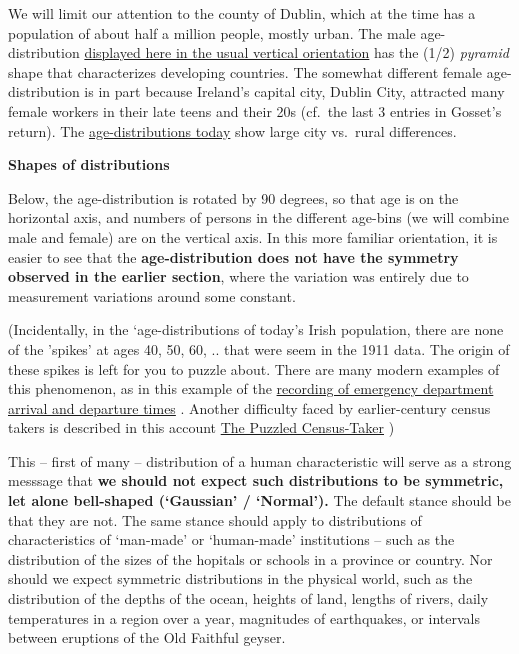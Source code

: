 \documentclass[
]{article}
\begin{document}
We will limit our attention to the county of Dublin, which at the time
has a population of about half a million people, mostly urban. The male
age-distribution
\href{http://www.medicine.mcgill.ca/epidemiology/hanley/bios601/MeanQuantiles2019.pdf\#page=18}{displayed
here in the usual vertical orientation} has the (1/2) \emph{pyramid}
shape that characterizes developing countries. The somewhat different
female age-distribution is in part because Ireland's capital city,
Dublin City, attracted many female workers in their late teens and their
20s (cf.~the last 3 entries in Gosset's return). The
\href{https://www.cso.ie/en/releasesandpublications/ep/p-cp3oy/cp3/aad/}{age-distributions
today} show large city vs.~rural differences.

\textbf{Shapes of distributions}

Below, the age-distribution is rotated by 90 degrees, so that age is on
the horizontal axis, and numbers of persons in the different age-bins
(we will combine male and female) are on the vertical axis. In this more
familiar orientation, it is easier to see that the
\textbf{age-distribution does not have the symmetry observed in the
earlier section}, where the variation was entirely due to measurement
variations around some constant.

(Incidentally, in the `age-distributions of today's Irish population,
there are none of the 'spikes' at ages 40, 50, 60, .. that were seem in
the 1911 data. The origin of these spikes is left for you to puzzle
about. There are many modern examples of this phenomenon, as in this
example of the
\href{http://www.medicine.mcgill.ca/epidemiology/hanley/bios601/ch-chapterPlusNotes-ch3-2019.pdf\#page=21}{recording
of emergency department arrival and departure times} . Another
difficulty faced by earlier-century census takers is described in this
account
\href{https://books.google.ca/books?id=fUsPAAAAYAAJ\&pg=PA118\&dq=John+Godfrey+Saxe+census-taker\&hl=en\&sa=X\&ved=0ahUKEwjQv6f04OvVAhUL5IMKHUZfBfgQ6AEIJjAA\#v=onepage\&q=John\%20Godfrey\%20Saxe\%20census-taker\&f=false}{The
Puzzled Census-Taker} )

This -- first of many -- distribution of a human characteristic will
serve as a strong messsage that \textbf{we should not expect such
distributions to be symmetric, let alone bell-shaped (`Gaussian' /
`Normal').} The default stance should be that they are not. The same
stance should apply to distributions of characteristics of `man-made' or
`human-made' institutions -- such as the distribution of the sizes of
the hopitals or schools in a province or country. Nor should we expect
symmetric distributions in the physical world, such as the distribution
of the depths of the ocean, heights of land, lengths of rivers, daily
temperatures in a region over a year, magnitudes of earthquakes, or
intervals between eruptions of the Old Faithful geyser.
\end{document}
